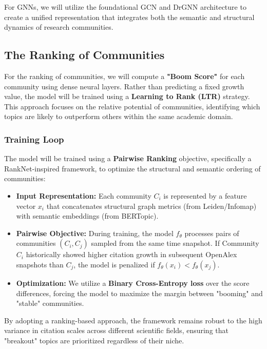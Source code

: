 \documentclass[a4paper,12pt]{article}
\begin{document}
For GNNs, we will utilize the foundational GCN\parencite{kipf_semi-supervised_2016} and DrGNN 
architecture\parencite{zhang_gresnet_2019} to create a unified representation that 
integrates both the semantic and structural dynamics of research communities. 

\subsection{The Ranking of Communities}
For the ranking of communities, we will compute a \textbf{"Boom Score"} for each community using dense neural layers. Rather than predicting a fixed growth value, the model will be trained using a \textbf{Learning to Rank (LTR)} strategy. This approach focuses on the relative potential of communities, identifying which topics are likely to outperform others within the same academic domain.

\subsubsection{Training Loop}
The model will be trained using a \textbf{Pairwise Ranking} objective, specifically a RankNet-inspired framework, to optimize the structural and semantic ordering of communities:
\vspace{-25pt}
\begin{itemize}
    \item \textbf{Input Representation:} Each community $C_i$ is represented by a feature vector $x_i$ that concatenates structural graph metrics (from Leiden/Infomap) with semantic embeddings (from BERTopic).
    \item \textbf{Pairwise Objective:} During training, the model $f_\theta$ processes pairs of communities $(C_i, C_j)$ sampled from the same time snapshot. If Community $C_i$ historically showed higher citation growth in subsequent OpenAlex snapshots than $C_j$, the model is penalized if $f_\theta(x_i) < f_\theta(x_j)$.
    \item \textbf{Optimization:} We utilize a \textbf{Binary Cross-Entropy loss} over the score differences, forcing the model to maximize the margin between "booming" and "stable" communities. 
\end{itemize}
\vspace{-20pt}
By adopting a ranking-based approach, the framework remains robust to the high variance in citation scales across different scientific fields, ensuring that "breakout" topics are prioritized regardless of their niche.
\newpage
\end{document}
